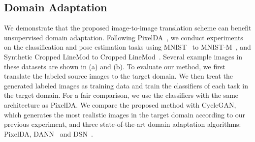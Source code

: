 \documentclass[runningheads]{llncs}
\begin{document}
\subsection{Domain Adaptation}
\vspace{-1mm}
We demonstrate that the proposed image-to-image translation scheme can benefit unsupervised domain adaptation.
%
%
Following PixelDA~\cite{bousmalis2017unsupervisedda}, we conduct experiments on the classification and pose estimation tasks using MNIST~\cite{lecun1998MNIST} to MNIST-M~\cite{ganin2016MNISTM}, and Synthetic Cropped LineMod to Cropped LineMod~\cite{hinterstoisser2012linemod,wohlhart2015croplinemod}.
%
Several example images in these datasets are shown in  (a) and (b).
%
To evaluate our method, we first translate the labeled source images to the target domain.
%
We then treat the generated labeled images as training data and train the classifiers of each task in the target domain.
%
For a fair comparison, we use the classifiers with the same architecture as PixelDA.
%
We compare the proposed method with CycleGAN, which generates the most realistic images in the target domain according to our previous experiment, and three state-of-the-art domain adaptation algorithms: PixelDA, DANN~\cite{ganin2016domain} and DSN~\cite{bousmalis2016domain}.
\end{document}
